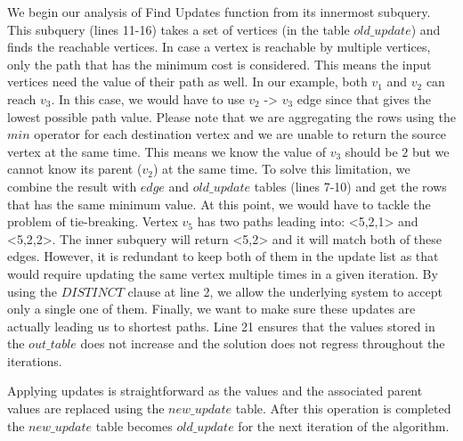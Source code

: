 We begin our analysis of Find Updates function from its innermost subquery. This subquery (lines 11-16) takes a set of vertices (in the table $old\_update$) and finds the reachable vertices. In case a vertex is reachable by multiple vertices, only the path that has the minimum cost is considered. This means the input vertices need the value of their path as well. In our example, both $v_1$ and $v_2$ can reach $v_3$. In this case, we would have to use $v_2$ -> $v_3$ edge since that gives the lowest possible path value. Please note that we are aggregating the rows using the $min$ operator for each destination vertex and we are unable to return the source vertex at the same time. This means we know the value of $v_3$ should be $2$ but we cannot know its parent ($v_2$) at the same time. To solve this limitation, we combine the result with $edge$ and $old\_update$ tables (lines 7-10) and get the rows that has the same minimum value. At this point, we would have to tackle the problem of tie-breaking. Vertex $v_5$ has two paths leading into: <5,2,1> and <5,2,2>. The inner subquery will return <5,2> and it will match both of these edges. However, it is redundant to keep both of them in the update list as that would require updating the same vertex multiple times in a given iteration. By using the $DISTINCT$ clause at line 2, we allow the underlying system to accept only a single one of them. Finally, we want to make sure these updates are actually leading us to shortest paths. Line 21 ensures that the values stored in the $out\_table$ does not increase and the solution does not regress throughout the iterations.

Applying updates is straightforward as the values and the associated parent values are replaced using the $new\_update$ table. After this operation is completed the $new\_update$ table becomes $old\_update$ for the next iteration of the algorithm.

